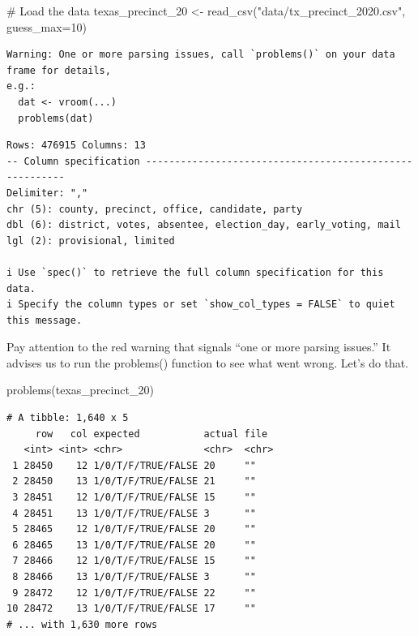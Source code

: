\documentclass[
  letterpaper,
  DIV=11,
  numbers=noendperiod]{scrreprt}
\newenvironment{Shaded}{\begin{snugshade}}{\end{snugshade}}
\newcommand{\AttributeTok}[1]{\textcolor[rgb]{0.40,0.45,0.13}{#1}}
\newcommand{\CommentTok}[1]{\textcolor[rgb]{0.37,0.37,0.37}{#1}}
\newcommand{\DecValTok}[1]{\textcolor[rgb]{0.68,0.00,0.00}{#1}}
\newcommand{\FunctionTok}[1]{\textcolor[rgb]{0.28,0.35,0.67}{#1}}
\newcommand{\NormalTok}[1]{\textcolor[rgb]{0.00,0.23,0.31}{#1}}
\newcommand{\OtherTok}[1]{\textcolor[rgb]{0.00,0.23,0.31}{#1}}
\newcommand{\StringTok}[1]{\textcolor[rgb]{0.13,0.47,0.30}{#1}}
\begin{document}
\begin{Shaded}
\begin{Highlighting}[]
\CommentTok{\# Load the data}
\NormalTok{texas\_precinct\_20 }\OtherTok{\textless{}{-}} \FunctionTok{read\_csv}\NormalTok{(}\StringTok{"data/tx\_precinct\_2020.csv"}\NormalTok{, }\AttributeTok{guess\_max=}\DecValTok{10}\NormalTok{)}
\end{Highlighting}
\end{Shaded}

\begin{verbatim}
Warning: One or more parsing issues, call `problems()` on your data frame for details,
e.g.:
  dat <- vroom(...)
  problems(dat)
\end{verbatim}

\begin{verbatim}
Rows: 476915 Columns: 13
-- Column specification --------------------------------------------------------
Delimiter: ","
chr (5): county, precinct, office, candidate, party
dbl (6): district, votes, absentee, election_day, early_voting, mail
lgl (2): provisional, limited

i Use `spec()` to retrieve the full column specification for this data.
i Specify the column types or set `show_col_types = FALSE` to quiet this message.
\end{verbatim}

Pay attention to the red warning that signals ``one or more parsing
issues.'' It advises us to run the problems() function to see what went
wrong. Let's do that.

\begin{Shaded}
\begin{Highlighting}[]
\FunctionTok{problems}\NormalTok{(texas\_precinct\_20)}
\end{Highlighting}
\end{Shaded}

\begin{verbatim}
# A tibble: 1,640 x 5
     row   col expected           actual file 
   <int> <int> <chr>              <chr>  <chr>
 1 28450    12 1/0/T/F/TRUE/FALSE 20     ""   
 2 28450    13 1/0/T/F/TRUE/FALSE 21     ""   
 3 28451    12 1/0/T/F/TRUE/FALSE 15     ""   
 4 28451    13 1/0/T/F/TRUE/FALSE 3      ""   
 5 28465    12 1/0/T/F/TRUE/FALSE 20     ""   
 6 28465    13 1/0/T/F/TRUE/FALSE 20     ""   
 7 28466    12 1/0/T/F/TRUE/FALSE 15     ""   
 8 28466    13 1/0/T/F/TRUE/FALSE 3      ""   
 9 28472    12 1/0/T/F/TRUE/FALSE 22     ""   
10 28472    13 1/0/T/F/TRUE/FALSE 17     ""   
# ... with 1,630 more rows
\end{verbatim}
\end{document}

